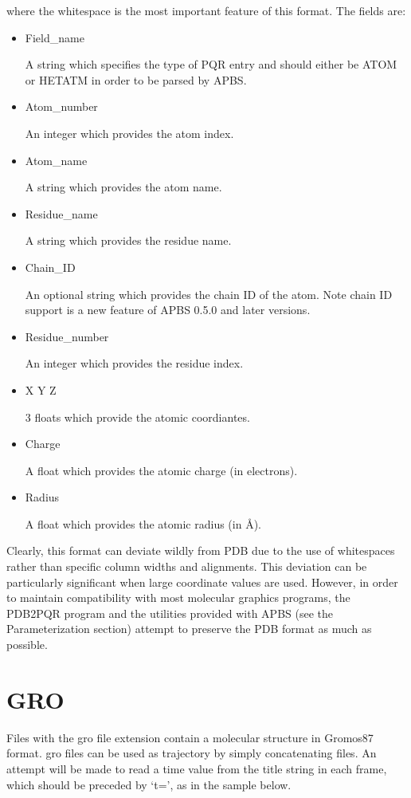 \documentclass[letterpaper,10pt,english]{sphinxmanual}
\begin{document}
where the whitespace is the most important feature of this format. The fields are:
\begin{itemize}
\item {} 
Field\_name

A string which specifies the type of PQR entry and should either be ATOM or HETATM in order to be parsed by APBS.

\item {} 
Atom\_number

An integer which provides the atom index.

\item {} 
Atom\_name

A string which provides the atom name.

\item {} 
Residue\_name

A string which provides the residue name.

\item {} 
Chain\_ID

An optional string which provides the chain ID of the atom. Note chain ID support is a new feature of APBS 0.5.0 and later versions.

\item {} 
Residue\_number

An integer which provides the residue index.

\item {} 
X Y Z

3 floats which provide the atomic coordiantes.

\item {} 
Charge

A float which provides the atomic charge (in electrons).

\item {} 
Radius

A float which provides the atomic radius (in Å).

\end{itemize}

Clearly, this format can deviate wildly from PDB due to the use of whitespaces
rather than specific column widths and alignments. This deviation can be
particularly significant when large coordinate values are used. However, in order
to maintain compatibility with most molecular graphics programs, the PDB2PQR
program and the utilities provided with APBS (see the Parameterization section)
attempt to preserve the PDB format as much as possible.


\section{GRO}
\label{documentation_pages/file_format:gro}
Files with the gro file extension contain a molecular structure in Gromos87 format. gro files
can be used as trajectory by simply concatenating files. An attempt will be made to read a
time value from the title string in each frame, which should be preceded by `t=', as in the
sample below.
\end{document}
